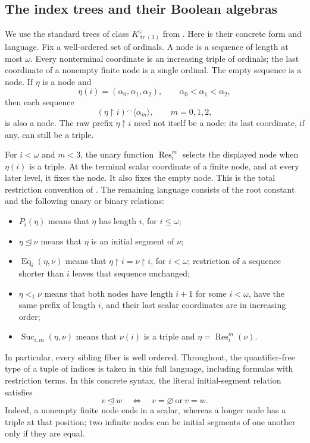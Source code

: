 \documentclass[11pt]{article}
\theoremstyle{definition}
\theoremstyle{remark}
\newcommand{\Res}{\operatorname{Res}}
\newcommand{\Eq}{\operatorname{Eq}}
\newcommand{\restr}{\mathbin{\upharpoonright}}
\newcommand{\tr}{\operatorname{tr}}
\begin{document}
\subsection{The index trees and their Boolean algebras}

We use the standard trees of class $K^\omega_{\tr(3)}$ from
\cite[Definition~1.2]{Shelah2023}.  Here is their concrete form and language.
Fix a well-ordered set of ordinals.  A node is a sequence of length at most
$\omega$.  Every nonterminal coordinate is an increasing triple of ordinals;
the last coordinate of a nonempty finite node is a single ordinal.  The empty
sequence is a node.  If $\eta$ is a node and
\[
  \eta(i)=(\alpha_0,\alpha_1,\alpha_2),
  \qquad \alpha_0<\alpha_1<\alpha_2,
\]
then each sequence
\[
  (\eta\restr i)\mathbin{{}^\frown}\langle\alpha_m\rangle,
  \qquad m=0,1,2,
\]
is also a node.  The raw prefix $\eta\restr i$ need not itself be a node:
its last coordinate, if any, can still be a triple.

For $i<\omega$ and $m<3$, the unary function $\Res_i^m$ selects the displayed
node when $\eta(i)$ is a triple.  At the terminal scalar coordinate of a
finite node, and at every later level, it fixes the node.  It also fixes the
empty node.  This is the total restriction convention of
\cite[Definition~1.2(1)(B)($\theta$)]{Shelah2023}.
The remaining language consists of the root constant and the following
unary or binary relations:
\begin{itemize}
\item $P_i(\eta)$ means that $\eta$ has length $i$, for
      $i\leq\omega$;
\item $\eta\unlhd\nu$ means that $\eta$ is an initial segment of $\nu$;
\item $\Eq_i(\eta,\nu)$ means that
      $\eta\restr i=\nu\restr i$, for $i<\omega$; restriction of a
      sequence shorter than $i$ leaves that sequence unchanged;
\item $\eta<_1\nu$ means that both nodes have length $i+1$ for some
      $i<\omega$, have the same prefix of length $i$, and their last scalar
      coordinates are in increasing order;
\item $\operatorname{Suc}_{i,m}(\eta,\nu)$ means that $\nu(i)$ is a
      triple and $\eta=\Res_i^m(\nu)$.
\end{itemize}
In particular, every sibling fiber is well ordered.  Throughout, the
quantifier-free type of a tuple of indices is taken in this full language,
including formulas with restriction terms.
In this concrete syntax, the literal initial-segment relation satisfies
\[
 v\unlhd w\quad\Longleftrightarrow\quad v=\varnothing\ \text{or}\ v=w.
\]
Indeed, a nonempty finite node ends in a scalar, whereas a longer node
has a triple at that position; two infinite nodes can be initial
segments of one another only if they are equal.
\end{document}
